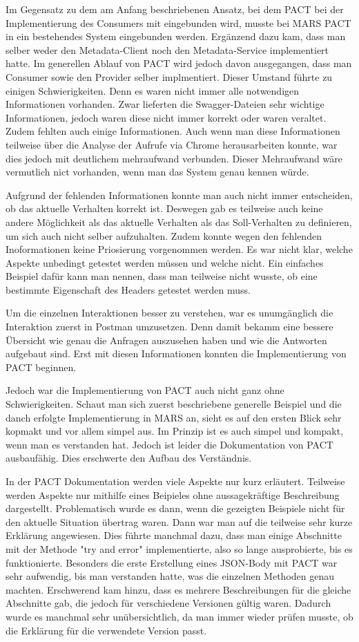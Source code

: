 \documentclass{llncs}
\begin{document}
Im Gegensatz zu dem am Anfang beschriebenen Ansatz, bei dem PACT bei der Implementierung des Consumers mit eingebunden wird, musste bei MARS PACT in ein bestehendes System eingebunden werden. Ergänzend dazu kam, dass man selber weder den Metadata-Client noch den Metadata-Service implementiert hatte. Im generellen Ablauf von PACT wird jedoch davon ausgegangen, dass man Consumer sowie den Provider selber implmentiert. Dieser Umstand führte zu einigen Schwierigkeiten.
Denn es waren nicht immer alle notwendigen Informationen vorhanden. Zwar lieferten die Swagger-Dateien sehr wichtige Informationen, jedoch waren diese nicht immer korrekt oder waren veraltet. Zudem fehlten auch einige Informationen. Auch wenn man diese Informationen teilweise über die Analyse der Aufrufe via Chrome herausarbeiten konnte, war dies jedoch mit deutlichem mehraufwand verbunden. Dieser Mehraufwand wäre vermutlich nict vorhanden, wenn man das System genau kennen würde.

Aufgrund der fehlenden Informationen konnte man auch nicht immer entscheiden, ob das aktuelle Verhalten korrekt ist. Deswegen gab es teilweise auch keine andere Möglichkeit als das aktuelle Verhalten als das Soll-Verhalten zu definieren, um sich auch nicht selber aufzuhalten. Zudem konnte wegen den fehlenden Inoformationen keine Priosierung vorgenommen werden. Es war nicht klar, welche Aspekte unbedingt getestet werden müssen und welche nicht. Ein einfaches Beispiel dafür kann man nennen, dass man teilweise nicht wusste, ob eine bestimmte Eigenschaft des Headers getestet werden muss.

Um die einzelnen Interaktionen besser zu verstehen, war es unumgänglich die Interaktion zuerst in Postman umzusetzen. Denn damit bekamm eine bessere Übersicht wie genau die Anfragen auszusehen haben und wie die Antworten aufgebaut sind. Erst mit diesen Informationen konnten die Implementierung von PACT beginnen.

Jedoch war die Implementierung von PACT auch nicht ganz ohne Schwierigkeiten. Schaut man sich zuerst beschriebene generelle Beispiel und die danch erfolgte Implementierung in MARS an, sieht es auf den ersten Blick sehr kopmakt und vor allem simpel aus. Im Prinzip ist es auch simpel und kompakt, wenn man es verstanden hat. Jedoch ist leider die Dokumentation von PACT ausbaufähig. Dies erschwerte den Aufbau des Verständnis.

In der PACT Dokumentation werden viele Aspekte nur kurz erläutert. Teilweise werden Aspekte nur mithilfe eines Beipieles ohne aussagekräftige Beschreibung dargestellt. Problematisch wurde es dann, wenn die gezeigten Beispiele nicht für den aktuelle Situation übertrag waren. Dann war man auf die teilweise sehr kurze Erklärung angewiesen. Dies führte manchmal dazu, dass man einige Abschnitte mit der Methode "try and error" implementierte, also so lange ausprobierte, bis es funktionierte. Besonders die erste Erstellung eines JSON-Body mit PACT war sehr aufwendig, bis man verstanden hatte, was die einzelnen Methoden genau machten. Erschwerend kam hinzu, dass es mehrere Beschreibungen für die gleiche Abschnitte gab, die jedoch für verschiedene Versionen gültig waren. Dadurch wurde es manchmal sehr unübersichtlich, da man immer wieder prüfen musste, ob die Erklärung für die verwendete Version passt.
\end{document}
